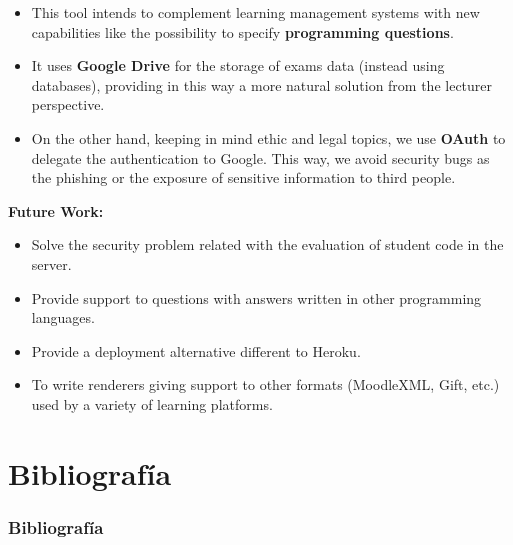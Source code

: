 \documentclass{beamer}
\begin{document}
\begin{frame}[allowframebreaks]
  \begin{itemize}
    \item This tool intends to complement learning management systems with new capabilities like the possibility to specify {\bfseries programming questions}.
    \item It uses {\bfseries Google Drive} for the storage of exams data (instead using databases),
    providing in this way a more natural solution from the lecturer perspective.
    \item On the other hand, keeping in mind ethic and legal topics, we use {\bfseries OAuth} to delegate the authentication to Google. 
    This way, we avoid security bugs as the phishing or the exposure of sensitive information to third people.
  \end{itemize}
  \framebreak
  
  {\bf Future Work:}
  \begin{itemize}
    \item Solve the security problem related with the evaluation of student code in the server.
    \item Provide support to questions with answers written in other programming languages.
    \item Provide a deployment alternative different to Heroku.
    \item To write renderers giving support to other formats (MoodleXML, Gift, etc.) used by a variety of learning platforms.
  \end{itemize}
\end{frame}


\section{Bibliografía}
\begin{frame}[allowframebreaks]
  \frametitle{Bibliografía}
  
  
  \nocite{*}
\end{frame}
\end{document}
